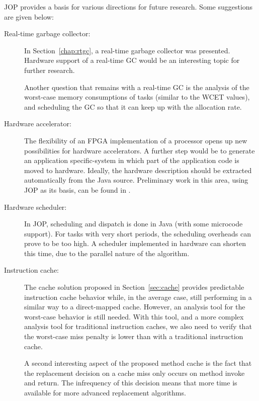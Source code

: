 JOP provides a basis for various directions for future research.
Some suggestions are given below:
%
\begin{description}
    \item[Real-time garbage collector:]
In Section~\ref{chap:rtgc}, a real-time garbage collector was
presented. Hardware support of a real-time GC would be an
interesting topic for further research.

Another question that remains with a real-time GC is the analysis of
the worst-case memory consumptions of tasks (similar to the WCET
values), and scheduling the GC so that it can keep up with the
allocation rate.

    \item[Hardware accelerator:] The flexibility of an FPGA
        implementation of a processor opens up new possibilities
        for hardware accelerators. A further step would be to
        generate an application specific-system in which part of
        the application code is moved to hardware. Ideally, the
        hardware description should be extracted automatically
        from the Java source. Preliminary work in this area,
        using JOP as its basis, can be found in \cite{jop:sac05,
        jop:hwmethods}.

    \item[Hardware scheduler:]
In JOP, scheduling and dispatch is done in Java (with some microcode
support). For tasks with very short periods, the scheduling
overheads can prove to be too high. A scheduler implemented in
hardware can shorten this time, due to the parallel nature of the
algorithm.



    \item[Instruction cache:]
The cache solution proposed in Section~\ref{sec:cache} provides
predictable instruction cache behavior while, in the average case,
still performing in a similar way to a direct-mapped cache. However,
an analysis tool for the worst-case behavior is still needed. With
this tool, and a more complex analysis tool for traditional
instruction caches, we also need to verify that the worst-case miss
penalty is lower than with a traditional instruction cache.

A second interesting aspect of the proposed method cache is the fact
that the replacement decision on a cache miss only occurs on method
invoke and return. The infrequency of this decision means that more
time is available for more advanced replacement algorithms.



\end{description}
